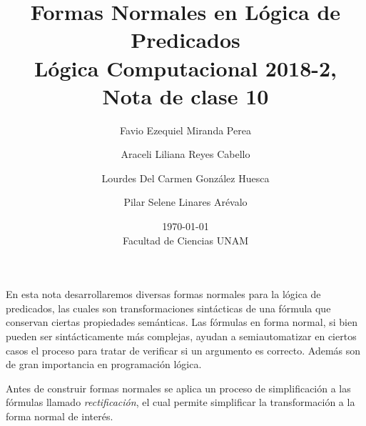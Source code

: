 \documentclass[11pt,letterpaper]{article}
\title{Formas Normales en Lógica de Predicados \\
L\'ogica Computacional 2018-2, Nota de clase 10}
\author{Favio Ezequiel Miranda Perea\and Araceli Liliana Reyes Cabello\and
Lourdes Del Carmen Gonz\'alez Huesca \and Pilar Selene Linares Ar\'evalo}
\date{\today\\ Facultad de Ciencias UNAM}
\begin{document}
\maketitle



En esta nota desarrollaremos diversas formas normales para la lógica de
predicados, las cuales son transformaciones sintácticas de una f\'ormula que 
conservan ciertas propiedades sem\'anticas. Las fórmulas en forma normal, si
bien pueden ser sintácticamente más complejas, ayudan a semiautomatizar en
ciertos casos el proceso para tratar de verificar si un argumento es
correcto. Además son de gran importancia en programación lógica.

\bigskip

Antes de construir formas normales se aplica un proceso de
simplificación a las f\'ormulas llamado \emph{rectificaci\'on}, el cual permite 
simplificar la transformación a la forma normal de 
interés.

\end{document}
